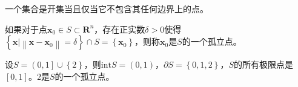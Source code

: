 \documentclass[main.tex]{subfiles}
\begin{document}
\begin{corollary}
一个集合是开集当且仅当它不包含其任何边界上的点。
\end{corollary}

\begin{definition}[孤立点]
如果对于点$\mathbf{x}_0\in S\subset\mathbf{R}^n$，存在正实数$\delta>0$使得$\left\{\mathbf{x}|\left\|\mathbf{x}-\mathbf{x}_0\right\|=\delta\right\}\cap S=\left\{\mathbf{x}_0\right\}$，则称$\mathbf{x}_0$是$S$的一个孤立点。
\end{definition}

\begin{example}
设$S=\left(0,1\right]\cup\left\{2\right\}$，则$\mathrm{int}S=\left(0,1\right)$，$\partial S=\left\{0,1,2\right\}$，$S$的所有极限点是$\left[0,1\right]$。$2$是$S$的一个孤立点。
\end{example}
\end{document}
